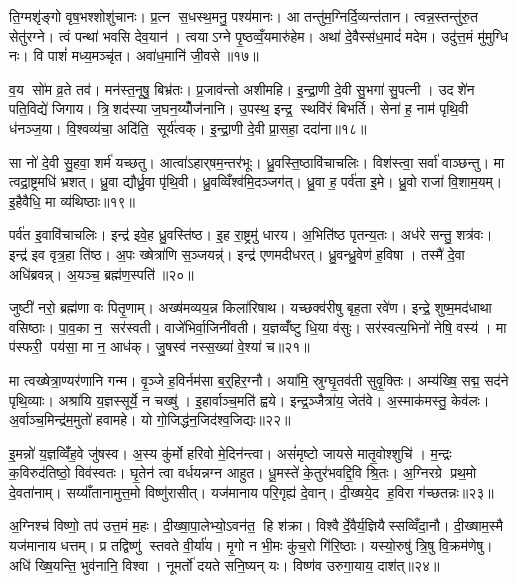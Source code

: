 ति॒ग्मशृ॑ङ्गो वृष॒भश्शोशु॑चानः। प्र॒त्न स॒धस्थ॒मनु॒ पश्य॑मानः। आ तन्तु॑म॒ग्निर्दि॒व्यन्त॑तान। त्वन्न॒स्तन्तु॑रु॒त सेतु॑रग्ने। त्वं पन्था॑ भवसि देव॒यान॑। त्वयाऽग्ने पृ॒ष्ठव्वँ॒यमारु॑हेम। अथा॑ दे॒वैस्स॑ध॒मादं॑ मदेम। उदु॑त्त॒मं मु॑मुग्धि नः। वि पाशं॑ मध्य॒मञ्चृ॑त। अवा॑ध॒मानि॑ जी॒वसे॥१७॥

व॒य सो॑म व्र॒ते तव॑। मन॑स्त॒नूषु॒ बिभ्र॑तः। प्र॒जाव॑न्तो अशीमहि। इ॒न्द्रा॒णी दे॒वी सु॒भगा॑ सु॒पत्नी। उदशे॑न पति॒विद्ये॑ जिगाय। त्रि॒शद॑स्या ज॒घन॒य्योँज॑नानि। उ॒पस्थ॒ इन्द्र॒ स्थवि॑रं बिभर्ति। सेना॑ ह॒ नाम॑ पृथि॒वी ध॑नञ्ज॒या। वि॒श्वव्य॑चा॒ अदि॑ति॒ सूर्य॑त्वक्। इ॒न्द्रा॒णी दे॒वी प्रा॒सहा॒ ददा॑ना॥१८॥

सा नो॑ दे॒वी सु॒हवा॒ शर्म॑ यच्छतु। आत्वा॑ऽहार्‌षम॒न्तर॑भूः। ध्रु॒वस्ति॒ष्ठावि॑चाचलिः। विश॑स्त्वा॒ सर्वा॑ वाञ्छन्तु। मा त्वद्रा॒ष्ट्रमधि॑ भ्रशत्। ध्रु॒वा द्यौर्ध्रु॒वा पृ॑थि॒वी। ध्रु॒वव्विँश्व॑मि॒दञ्जग॑त्। ध्रु॒वा ह॒ पर्व॑ता इ॒मे। ध्रु॒वो राजा॑ वि॒शाम॒यम्। इ॒हैवैधि॒ मा व्य॑थिष्ठाः॥१९॥

पर्व॑त इ॒वावि॑चाचलिः। इन्द्र॑ इवे॒ह ध्रु॒वस्ति॑ष्ठ। इ॒ह रा॒ष्ट्रमु॑ धारय। अ॒भिति॑ष्ठ पृतन्य॒तः। अध॑रे सन्तु॒ शत्र॑वः। इन्द्र॑ इव वृत्र॒हा ति॑ष्ठ। अ॒पः ख्षेत्रा॑णि स॒ञ्जयन्न्॑। इन्द्र॑ एणमदीधरत्। ध्रु॒वन्ध्रु॒वेण॑ ह॒विषा। तस्मै॑ दे॒वा अधि॑ब्रवन्न्। अ॒यञ्च॒ ब्रह्म॑ण॒स्पति॑॥२०॥\anuvakamend[ह॒विर्भि॑रा॒स्य॑मभि॒ दास॑तो विप॒श्चित॒मप्र॑यावञ्जी॒वसे॒ ददा॑ना व्यथिष्ठा ब्रव॒न्नेक॑ञ्च]

जुष्टी॑ नरो॒ ब्रह्म॑णा वः पितृ॒णाम्। अख्ष॑मव्यय॒न्न किला॑रिषाथ। यच्छक्व॑रीषु बृह॒ता रवे॑ण। इन्द्रे॒ शुष्म॒मद॑धाथा वसिष्ठाः। पा॒व॒का न॒ सर॑स्वती। वाजे॑भिर्वा॒जिनी॑वती। य॒ज्ञव्वँ॑ष्टु धि॒या व॑सुः। सर॑स्वत्य॒भिनो॑ नेषि॒ वस्य॑। मा प॑स्फरी॒ पय॑सा॒ मा न॒ आध॑क्। जु॒षस्व॑ नस्स॒ख्या॑ वे॒श्या॑ च॥२१॥

मा त्वख्षेत्रा॒ण्यर॑णानि गन्म। वृ॒ञ्जे ह॒विर्नम॑सा ब॒र्॒हिर॒ग्नौ। अया॑मि॒ स्रुग्घृ॒तव॑ती सुवृ॒क्तिः। अम्य॑ख्षि॒ सद्म॒ सद॑ने पृथि॒व्याः। अश्रा॑यि य॒ज्ञस्सूर्ये॒ न चख्षु॑। इ॒हार्वाञ्च॒मति॑ ह्वये। इन्द्र॒ञ्जैत्रा॑य॒ जेत॑वे। अ॒स्माक॑मस्तु॒ केव॑लः। अ॒र्वाञ्च॒मिन्द्र॑म॒मुतो॑ हवामहे। यो गो॒जिद्ध॑न॒जिद॑श्व॒जिद्यः॥२२॥

इ॒मन्नो॑ य॒ज्ञव्विँ॑ह॒वे जु॑षस्व। अ॒स्य कु॑र्मो हरिवो मे॒दिन॑न्त्वा। असं॑मृष्टो जायसे मातृ॒वोश्शुचि॑। म॒न्द्रः क॒विरुद॑तिष्ठो॒ विव॑स्वतः। घृ॒तेन॑ त्वा वर्धयन्नग्न आहुत। धू॒मस्ते॑ के॒तुर॑भवद्दि॒वि श्रि॒तः। अ॒ग्निरग्रे प्रथ॒मो दे॒वता॑नाम्। सय्याँ॑तानामुत्त॒मो विष्णु॑रासीत्। यज॑मानाय परि॒गृह्य॑ दे॒वान्। दी॒ख्षये॒द ह॒विरा ग॑च्छतन्नः॥२३॥

अ॒ग्निश्च॑ विष्णो॒ तप॑ उत्त॒मं म॒हः। दी॒ख्षा॒पा॒लेभ्यो॒ऽवन॑त॒ हि श॑क्रा। विश्वैर्दे॒वैर्य॒ज्ञियैस्सव्विँदा॒नौ। दी॒ख्षाम॒स्मै यज॑मानाय धत्तम्। प्र तद्विष्णु॑ स्तवते वी॒र्या॑य। मृ॒गो न भी॒मः कु॑च॒रो गि॑रि॒ष्ठाः। यस्यो॒रुषु॑ त्रि॒षु वि॒क्रम॑णेषु। अधि॑ ख्षि॒यन्ति॒ भुव॑नानि॒ विश्वा। नूमर्तो॑ दयते सनि॒ष्यन् यः। विष्ण॑व उरुगा॒याय॒ दाश॑त्॥२४॥


